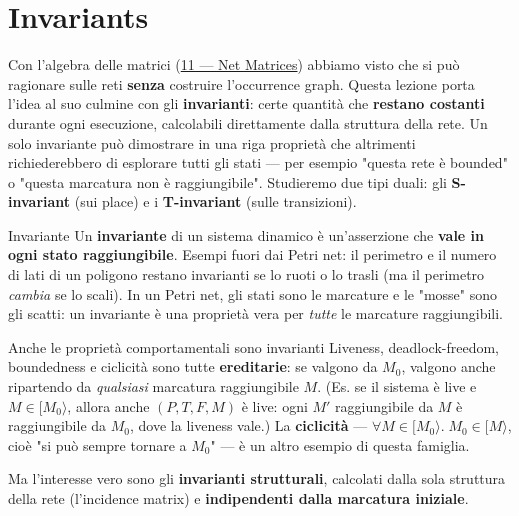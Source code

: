 \chapter{\texorpdfstring{Invariants}{Invariants}}
\label{ch:14}

Con l'algebra delle matrici (\hyperref[ch:11]{11 — Net Matrices}) abbiamo visto che si può ragionare sulle reti \textbf{senza} costruire l'occurrence graph. Questa lezione porta l'idea al suo culmine con gli \textbf{invarianti}: certe quantità che \textbf{restano costanti} durante ogni esecuzione, calcolabili direttamente dalla struttura della rete. Un solo invariante può dimostrare in una riga proprietà che altrimenti richiederebbero di esplorare tutti gli stati — per esempio "questa rete è bounded" o "questa marcatura non è raggiungibile". Studieremo due tipi duali: gli \textbf{S-invariant} (sui place) e i \textbf{T-invariant} (sulle transizioni).

\begin{boxdefinition}{Invariante}
Un \textbf{invariante} di un sistema dinamico è un'asserzione che \textbf{vale in ogni stato raggiungibile}. Esempi fuori dai Petri net: il perimetro e il numero di lati di un poligono restano invarianti se lo ruoti o lo trasli (ma il perimetro \emph{cambia} se lo scali). In un Petri net, gli stati sono le marcature e le "mosse" sono gli scatti: un invariante è una proprietà vera per \emph{tutte} le marcature raggiungibili.
\end{boxdefinition}

\begin{boxnote}{Anche le proprietà comportamentali sono invarianti}
Liveness, deadlock-freedom, boundedness e ciclicità sono tutte \textbf{ereditarie}: se valgono da $M_0$, valgono anche ripartendo da \emph{qualsiasi} marcatura raggiungibile $M$. (Es. se il sistema è live e $M \in [M_0\rangle$, allora anche $(P,T,F,M)$ è live: ogni $M'$ raggiungibile da $M$ è raggiungibile da $M_0$, dove la liveness vale.) La \textbf{ciclicità} — $\forall M \in [M_0\rangle.\; M_0 \in [M\rangle$, cioè "si può sempre tornare a $M_0$" — è un altro esempio di questa famiglia.
\end{boxnote}

Ma l'interesse vero sono gli \textbf{invarianti strutturali}, calcolati dalla sola struttura della rete (l'incidence matrix) e \textbf{indipendenti dalla marcatura iniziale}.

